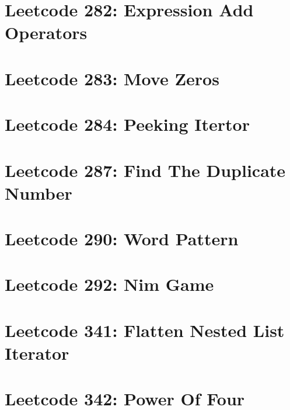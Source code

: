 \documentclass{article}
\begin{document}
\section*{Leetcode 282: Expression Add Operators}

\pagebreak 

\section*{Leetcode 283: Move Zeros}

\pagebreak 

\section*{Leetcode 284: Peeking Itertor}

\pagebreak 

\section*{Leetcode 287: Find The Duplicate Number}

\pagebreak 

\section*{Leetcode 290: Word Pattern}

\pagebreak 

\section*{Leetcode 292: Nim Game}

\pagebreak 

\section*{Leetcode 341: Flatten Nested List Iterator}

\pagebreak 

\section*{Leetcode 342: Power Of Four}

\pagebreak 
\end{document}
